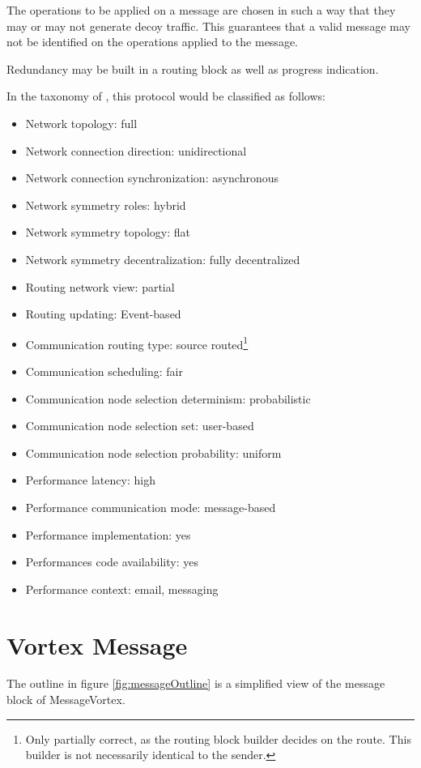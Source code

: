 The operations to be applied on a message are chosen in such a way that they may or may not generate decoy traffic. This guarantees that a valid message may not be identified on the operations applied to the message.

Redundancy may be built in a routing block as well as progress indication.

In the taxonomy of \cite{Shirazi2018}, this protocol would be classified as follows:

\begin{itemize}
	\item Network topology: full
	\item Network connection direction: unidirectional
	\item Network connection synchronization: asynchronous
	\item Network symmetry roles: hybrid
	\item Network symmetry topology: flat
	\item Network symmetry decentralization: fully decentralized
	\item Routing network view: partial
	\item Routing updating: Event-based
	\item Communication routing type: source routed\footnote{Only partially correct, as the routing block builder decides on the route. This builder is not necessarily identical to the sender.}
	\item Communication scheduling: fair
	\item Communication node selection determinism: probabilistic
	\item Communication node selection set: user-based
	\item Communication node selection probability: uniform
	\item Performance latency: high
	\item Performance communication mode: message-based
	\item Performance implementation: yes
	\item Performances code availability: yes
	\item Performance context: email, messaging
\end{itemize}

\section{Vortex Message}
The outline in figure \ref{fig:messageOutline} is a simplified view of the message block of MessageVortex.

